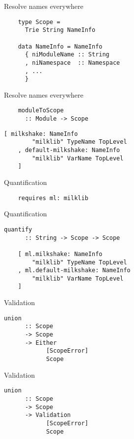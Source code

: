 \documentclass[20pt]{beamer}
\newcommand{\vspaced}{
    \vspace{5mm}
}
\begin{document}
\begin{frame}[fragile]{Resolve names everywhere}
    \begin{lstlisting}
    type Scope =
      Trie String NameInfo

    data NameInfo = NameInfo
      { niModuleName :: String
      , niNamespace  :: Namespace
      , ...
      }
    \end{lstlisting}
\end{frame}

\begin{frame}[fragile]{Resolve names everywhere}
    \begin{lstlisting}
    moduleToScope
      :: Module -> Scope
    \end{lstlisting}
    \vspaced
    \begin{lstlisting}[keywords = {}]
    [ milkshake: NameInfo
        "milklib" TypeName TopLevel
    , default-milkshake: NameInfo
        "milklib" VarName TopLevel
    ]
    \end{lstlisting}
\end{frame}

\begin{frame}[fragile]{Quantification}
    \begin{lstlisting}
    requires ml: milklib
    \end{lstlisting}
\end{frame}

\begin{frame}[fragile]{Quantification}
    \begin{lstlisting}[keywords = {}]
    quantify
      :: String -> Scope -> Scope

    [ ml.milkshake: NameInfo
        "milklib" TypeName TopLevel
    , ml.default-milkshake: NameInfo
        "milklib" VarName TopLevel
    ]
    \end{lstlisting}
\end{frame}

\begin{frame}[fragile]{Validation}
    \begin{lstlisting}[keywords = {}]
    union
      :: Scope
      -> Scope
      -> Either
            [ScopeError]
            Scope
    \end{lstlisting}
\end{frame}


\begin{frame}[fragile]{Validation}
    \begin{lstlisting}[keywords = {}]
    union
      :: Scope
      -> Scope
      -> Validation
            [ScopeError]
            Scope
    \end{lstlisting}
\end{frame}
\end{document}

